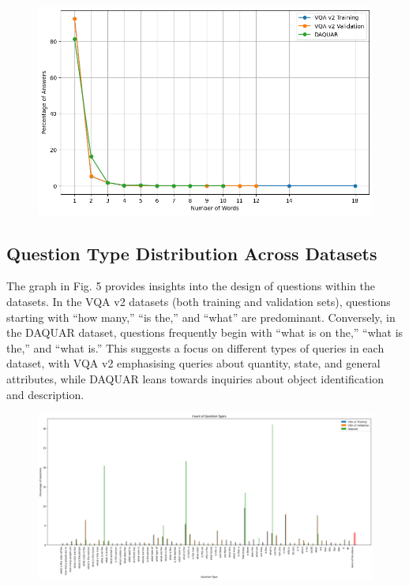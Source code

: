 \begin{figure}[htbp]
  \centering
   \includegraphics[width=\linewidth]{sec/Images/image4.png}
   \caption{}
   \label{fig:onecol}
\end{figure}

\subsection{Question Type Distribution Across Datasets}
The graph in Fig. 5 provides insights into the design of questions within the datasets. In the VQA v2 datasets (both training and validation sets), questions starting with “how many,” “is the,” and “what” are predominant. Conversely, in the DAQUAR dataset, questions frequently begin with “what is on the,” “what is the,” and “what is.” This suggests a focus on different types of queries in each dataset, with VQA v2 emphasising queries about quantity, state, and general attributes, while DAQUAR leans towards inquiries about object identification and description.



\begin{figure}[htbp]
  \centering
   \includegraphics[width=\linewidth]{sec/Images/image5.png}
   \caption{}
   \label{fig:onecol}
\end{figure}

